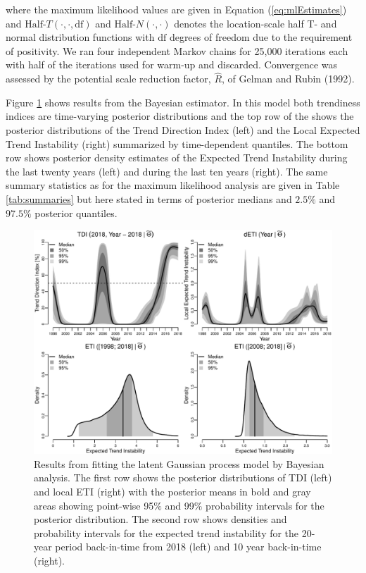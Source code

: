 \documentclass[11pt,]{article}
\theoremstyle{nonumberplain}
\begin{document}
where the maximum likelihood values are given in Equation
(\ref{eq:mlEstimates}) and \(\text{Half-}T(\cdot, \cdot, \mathrm{df})\)
and \(\text{Half-}N(\cdot, \cdot)\) denotes the location-scale half T-
and normal distribution functions with \(\mathrm{df}\) degrees of
freedom due to the requirement of positivity. We ran four independent
Markov chains for 25,000 iterations each with half of the iterations
used for warm-up and discarded. Convergence was assessed by the
potential scale reduction factor, \(\widehat{R}\), of Gelman and Rubin
(1992).

Figure \ref{fig:bayesFitPlot} shows results from the Bayesian estimator.
In this model both trendiness indices are time-varying posterior
distributions and the top row of the shows the posterior distributions
of the Trend Direction Index (left) and the Local Expected Trend
Instability (right) summarized by time-dependent quantiles. The bottom
row shows posterior density estimates of the Expected Trend Instability
during the last twenty years (left) and during the last ten years
(right). The same summary statistics as for the maximum likelihood
analysis are given in Table \ref{tab:summaries} but here stated in terms
of posterior medians and \(2.5\%\) and \(97.5\%\) posterior quantiles.

\begin{figure}[htb]
\center\includegraphics{../figures/bayesFitPlot.pdf}
\caption{Results from fitting the latent Gaussian process model by Bayesian analysis. The first row shows the posterior distributions of TDI (left) and local ETI (right) with the posterior means in bold and gray areas showing point-wise 95$\%$ and 99$\%$ probability intervals for the posterior distribution. The second row shows densities and probability intervals for the expected trend instability for the 20-year period back-in-time from 2018 (left) and 10 year back-in-time (right).}
\label{fig:bayesFitPlot}
\end{figure}
\end{document}
